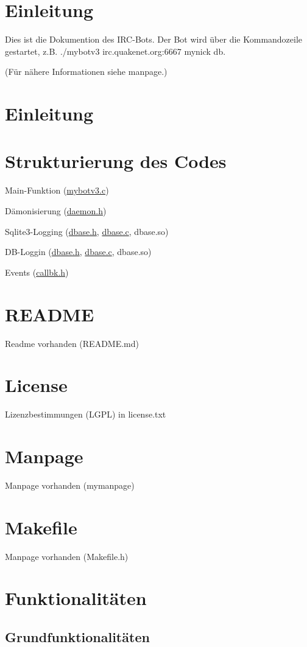 \hypertarget{index_sec1}{}\section{\-Einleitung}\label{index_sec1}
\-Dies ist die \-Dokumention des \-I\-R\-C-\/\-Bots. \-Der \-Bot wird über die \-Kommandozeile gestartet, z.\-B. ./mybotv3 irc.\-quakenet.\-org\-:6667 mynick db.

(\-Für nähere \-Informationen siehe manpage.) \hypertarget{index_sec1}{}\section{\-Einleitung}\label{index_sec1}
\hypertarget{index_sec1_1}{}\section{\-Strukturierung des Codes}\label{index_sec1_1}

\begin{DoxyItemize}
\item \-Main-\/\-Funktion (\hyperlink{mybotv3_8c}{mybotv3.\-c})
\item \-Dämonisierung (\hyperlink{daemon_8h}{daemon.\-h})
\item \-Sqlite3-\/\-Logging (\hyperlink{dbase_8h}{dbase.\-h}, \hyperlink{dbase_8c}{dbase.\-c}, dbase.\-so)
\item \-D\-B-\/\-Loggin (\hyperlink{dbase_8h}{dbase.\-h}, \hyperlink{dbase_8c}{dbase.\-c}, dbase.\-so)
\item \-Events (\hyperlink{callbk_8h}{callbk.\-h}) 
\end{DoxyItemize}\hypertarget{index_sec1_2}{}\section{\-R\-E\-A\-D\-M\-E}\label{index_sec1_2}
\-Readme vorhanden (\-R\-E\-A\-D\-M\-E.\-md) \hypertarget{index_sec1_3}{}\section{\-License}\label{index_sec1_3}
\-Lizenzbestimmungen (\-L\-G\-P\-L) in license.\-txt \hypertarget{index_sec1_4}{}\section{\-Manpage}\label{index_sec1_4}
\-Manpage vorhanden (mymanpage) \hypertarget{index_sec1_5}{}\section{\-Makefile}\label{index_sec1_5}
\-Manpage vorhanden (\-Makefile.\-h)\hypertarget{index_sec2}{}\section{\-Funktionalitäten}\label{index_sec2}
\hypertarget{index_sec2_1}{}\subsection{\-Grundfunktionalitäten}\label{index_sec2_1}

